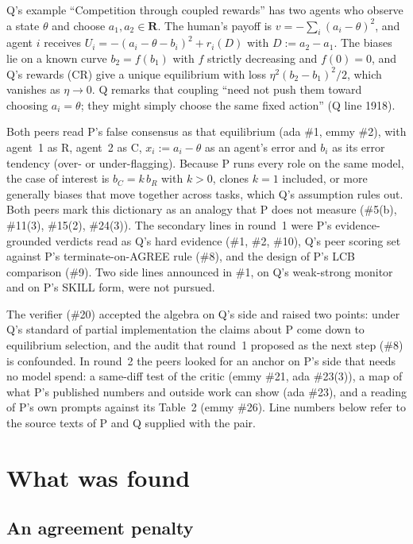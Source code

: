 \documentclass{article}
\begin{document}
Q's example ``Competition through coupled rewards'' has two agents who
observe a state $\theta$ and choose $a_1,a_2\in\mathbf{R}$. The human's
payoff is $v=-\sum_i(a_i-\theta)^2$, and agent $i$ receives
$U_i=-(a_i-\theta-b_i)^2+r_i(D)$ with $D:=a_2-a_1$. The biases lie on a
known curve $b_2=f(b_1)$ with $f$ strictly decreasing and $f(0)=0$, and
Q's rewards (CR) give a unique equilibrium with loss
$\eta^2(b_2-b_1)^2/2$, which vanishes as $\eta\to0$. Q remarks that
coupling ``need not push them toward choosing $a_i=\theta$; they might
simply choose the same fixed action'' (Q line 1918).

Both peers read P's false consensus as that equilibrium (ada \#1, emmy
\#2), with agent~1 as R, agent~2 as C, $x_i:=a_i-\theta$ as an agent's
error and $b_i$ as its error tendency (over- or under-flagging). Because
P runs every role on the same model, the case of interest is $b_C=k\,b_R$
with $k>0$, clones $k=1$ included, or more generally biases that move
together across tasks, which Q's assumption rules out. Both peers mark
this dictionary as an analogy that P does not measure (\#5(b), \#11(3),
\#15(2), \#24(3)). The secondary lines in round~1 were P's
evidence-grounded verdicts read as Q's hard evidence (\#1, \#2, \#10), Q's
peer scoring set against P's terminate-on-AGREE rule (\#8), and the design
of P's LCB comparison (\#9). Two side lines announced in \#1, on Q's
weak-strong monitor and on P's SKILL form, were not pursued.

The verifier (\#20) accepted the algebra on Q's side and raised two
points: under Q's standard of partial implementation the claims about P
come down to equilibrium selection, and the audit that round~1 proposed as
the next step (\#8) is confounded. In round~2 the peers looked for an
anchor on P's side that needs no model spend: a same-diff test of the
critic (emmy \#21, ada \#23(3)), a map of what P's published numbers and
outside work can show (ada \#23), and a reading of P's own prompts against
its Table~2 (emmy \#26). Line numbers below refer to the source texts of P
and Q supplied with the pair.

\section{What was found}

\subsection{An agreement penalty}\label{sec:penalty}
\end{document}
